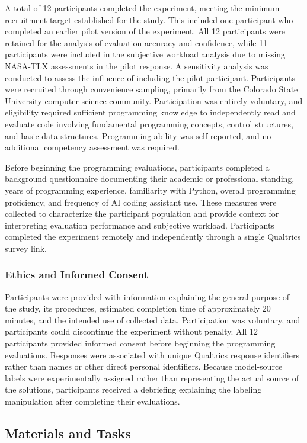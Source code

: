 \documentclass[manuscript,review]{acmart}
\begin{document}
A total of 12 participants completed the experiment, meeting the minimum recruitment target established for the study. This included one participant who completed an earlier pilot version of the experiment. All 12 participants were retained for the analysis of evaluation accuracy and confidence, while 11 participants were included in the subjective workload analysis due to missing NASA-TLX assessments in the pilot response. A sensitivity analysis was conducted to assess the influence of including the pilot participant. Participants were recruited through convenience sampling, primarily from the Colorado State University computer science community. Participation was entirely voluntary, and eligibility required sufficient programming knowledge to independently read and evaluate code involving fundamental programming concepts, control structures, and basic data structures. Programming ability was self-reported, and no additional competency assessment was required.

Before beginning the programming evaluations, participants completed a background questionnaire documenting their academic or professional standing, years of programming experience, familiarity with Python, overall programming proficiency, and frequency of AI coding assistant use. These measures were collected to characterize the participant population and provide context for interpreting evaluation performance and subjective workload. Participants completed the experiment remotely and independently through a single Qualtrics survey link.

\subsubsection{Ethics and Informed Consent}
Participants were provided with information explaining the general purpose of the study, its procedures, estimated completion time of approximately 20 minutes, and the intended use of collected data. Participation was voluntary, and participants could discontinue the experiment without penalty. All 12 participants provided informed consent before beginning the programming evaluations. Responses were associated with unique Qualtrics response identifiers rather than names or other direct personal identifiers. Because model-source labels were experimentally assigned rather than representing the actual source of the solutions, participants received a debriefing explaining the labeling manipulation after completing their evaluations.

\subsection{Materials and Tasks}
\end{document}
